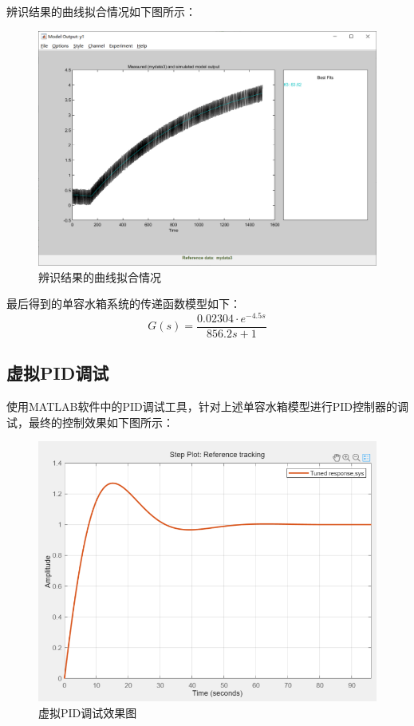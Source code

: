 \documentclass[UTF8]{article}
\begin{document}
辨识结果的曲线拟合情况如下图所示：
\begin{figure}[H]
    \centering %
    \includegraphics[width=.8\textwidth]{figure/水箱辨识-拟合曲线.png} 
    \caption{辨识结果的曲线拟合情况} %
\end{figure}

最后得到的单容水箱系统的传递函数模型如下：
\begin{equation*}
	G(s) = \frac{0.02304 \cdot e^{-4.5s}}{856.2s + 1}
\end{equation*}

\subsection{虚拟PID调试}
使用MATLAB软件中的PID调试工具，针对上述单容水箱模型进行PID控制器的调试，最终的控制效果如下图所示：
\begin{figure}[H]
    \centering %
    \includegraphics[width=.6\textwidth]{figure/水箱辨识-虚拟pid调试.png} 
    \caption{虚拟PID调试效果图} %
\end{figure}
\end{document}
